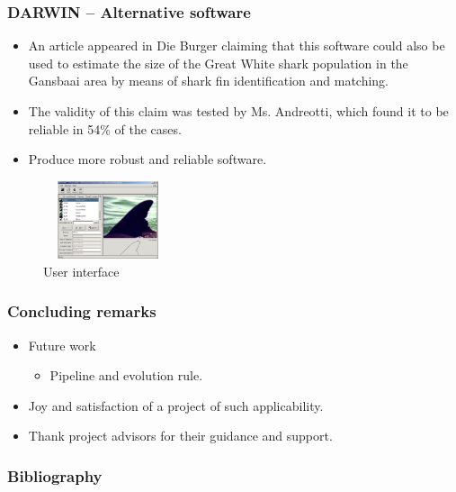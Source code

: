 \documentclass{beamer}
\newcommand{\myitem}{\item[$-$]}
\begin{document}
\begin{frame}
\frametitle{DARWIN -- Alternative software}
\begin{itemize}
 \item An article appeared in Die Burger claiming that this
 software could also be used to estimate the size of the Great White shark
 population in the Gansbaai area by means of shark fin identification and
 matching.\cite{Darwin}
 \pause
 \item The validity of this claim was tested by Ms. Andreotti, which found it to
 be reliable in 54\% of the cases.
 \pause
 \item Produce more robust and reliable software.
\end{itemize}
\pause
\begin{figure}
 \centering
 \includegraphics[width=1.5in, height=0.9in]{Darwin.jpg}
 \caption{User interface}
\end{figure}
\end{frame}


\begin{frame}
\frametitle{Concluding remarks}
\begin{itemize}
\item Future work
\begin{itemize}
 \myitem Pipeline and evolution rule.
\end{itemize}
\pause
\item Joy and satisfaction of a project of such applicability.
\pause
\item Thank project advisors for their guidance and support.
\end{itemize}
\end{frame}


\begin{frame}
\frametitle{Bibliography}


\end{frame}
\end{document}
